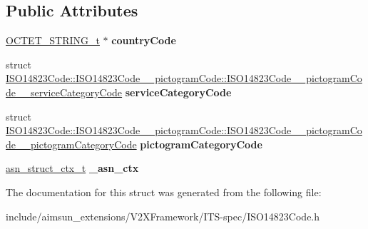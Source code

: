 \subsection*{Public Attributes}
\begin{DoxyCompactItemize}
\item 
\hyperlink{structOCTET__STRING}{O\+C\+T\+E\+T\+\_\+\+S\+T\+R\+I\+N\+G\+\_\+t} $\ast$ {\bfseries country\+Code}\hypertarget{structISO14823Code_1_1ISO14823Code____pictogramCode_a858714f0c1262154743a2441c2219e10}{}\label{structISO14823Code_1_1ISO14823Code____pictogramCode_a858714f0c1262154743a2441c2219e10}

\item 
struct \hyperlink{structISO14823Code_1_1ISO14823Code____pictogramCode_1_1ISO14823Code____pictogramCode____serviceCategoryCode}{I\+S\+O14823\+Code\+::\+I\+S\+O14823\+Code\+\_\+\+\_\+pictogram\+Code\+::\+I\+S\+O14823\+Code\+\_\+\+\_\+pictogram\+Code\+\_\+\+\_\+service\+Category\+Code} {\bfseries service\+Category\+Code}\hypertarget{structISO14823Code_1_1ISO14823Code____pictogramCode_a75f7d2e8a8b0a5fbec83cac3cfc7a72f}{}\label{structISO14823Code_1_1ISO14823Code____pictogramCode_a75f7d2e8a8b0a5fbec83cac3cfc7a72f}

\item 
struct \hyperlink{structISO14823Code_1_1ISO14823Code____pictogramCode_1_1ISO14823Code____pictogramCode____pictogramCategoryCode}{I\+S\+O14823\+Code\+::\+I\+S\+O14823\+Code\+\_\+\+\_\+pictogram\+Code\+::\+I\+S\+O14823\+Code\+\_\+\+\_\+pictogram\+Code\+\_\+\+\_\+pictogram\+Category\+Code} {\bfseries pictogram\+Category\+Code}\hypertarget{structISO14823Code_1_1ISO14823Code____pictogramCode_a926c8d32321d00124bbbf8f2bbb90ca0}{}\label{structISO14823Code_1_1ISO14823Code____pictogramCode_a926c8d32321d00124bbbf8f2bbb90ca0}

\item 
\hyperlink{structasn__struct__ctx__s}{asn\+\_\+struct\+\_\+ctx\+\_\+t} {\bfseries \+\_\+asn\+\_\+ctx}\hypertarget{structISO14823Code_1_1ISO14823Code____pictogramCode_a60356cf223bf4df57ae2d85d2968d6e6}{}\label{structISO14823Code_1_1ISO14823Code____pictogramCode_a60356cf223bf4df57ae2d85d2968d6e6}

\end{DoxyCompactItemize}


The documentation for this struct was generated from the following file\+:\begin{DoxyCompactItemize}
\item 
include/aimsun\+\_\+extensions/\+V2\+X\+Framework/\+I\+T\+S-\/spec/I\+S\+O14823\+Code.\+h\end{DoxyCompactItemize}
